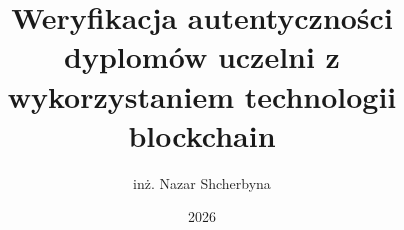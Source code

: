 \documentclass[thesis=mgr,faculty=ee]{EE-dyplom}
\title{Weryfikacja autentyczności dyplomów uczelni z wykorzystaniem technologii blockchain}
\author{inż. Nazar Shcherbyna}
\date{2026}
\begin{document}
    \glsaddall

    \frontpages

    
    
    
    
    
    
    
    

    \bibliografia

    \acronymslist
    \listoffigures
    \listoftables
\end{document}
